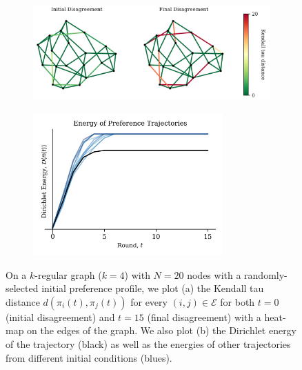 \documentclass[conference]{ieeeconf}
\newcommand{\E}{\mathcal{E}}
\begin{document}
\begin{figure}[h]
    \begin{subfigure}[b]{0.6\textwidth}
    \includegraphics[width=\textwidth]{figs/fig2alt.png}
    \caption{}
    \label{fig:2a}
    \end{subfigure}
    \hfill
    \begin{subfigure}[b]{0.4\textwidth}
    \centering
    \includegraphics[width=0.8\textwidth]{figs/fig2balt.png}
    \caption{}
    \label{fig:2b}
    \end{subfigure}
    \caption{On a $k$-regular graph ($k=4$) with $N =20$ nodes with a randomly-selected initial preference profile, we plot (a) the Kendall tau distance $d(\pi_i(t),\pi_j(t))$ for every $(i,j) \in \E$ for both $t=0$ (initial disagreement) and $t=15$ (final disagreement) with a heat-map on the edges of the graph. We also plot (b) the Dirichlet energy of the trajectory (black) as well as the energies of other trajectories from different initial conditions (blues).}
    \label{fig:2}
    \vspace{-1em}
\end{figure}


\vspace{-1em}


\end{document}

